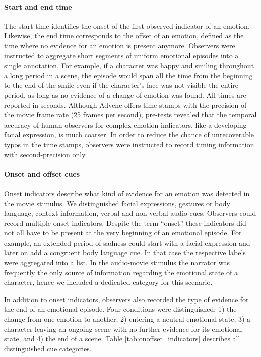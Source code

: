 \paragraph{Start and end time}

The start time identifies the onset of the first observed indicator of an
emotion. Likewise, the end time corresponds to the offset of an emotion,
defined as the time where no evidence for an emotion is present anymore.
Observers were instructed to aggregate short segments of uniform emotional
episodes into a single annotation. For example, if a character was happy and
smiling throughout a long period in a scene, the episode would span all the
time from the beginning to the end of the smile even if the character's face was
not visible the entire period, as long as no evidence of a change of emotion
was found.  All times are reported in seconds. Although Advene offers time
stamps with the precision of the movie frame rate (25 frames per second),
pre-tests revealed that the temporal accuracy of human observers for complex
emotion indicators, like a developing facial expression, is much coarser. In
order to reduce the chance of unrecoverable typos in the time stamps, observers
were instructed to record timing information with second-precision only.

\paragraph{Onset and offset cues}

Onset indicators describe what kind of evidence for an emotion was detected in
the movie stimulus. We distinguished facial expressions, gestures or body
language, context information, verbal and non-verbal audio cues. Observers
could record multiple onset indicators. Despite the term ``onset'' these
indicators did not all have to be present at the very beginning of an emotional
episode. For example, an extended period of sadness could start with a facial
expression and later on add a congruent body language cue. In that case the
respective labels were aggregated into a list. In the audio-movie stimulus the
narrator was frequently the only source of information regarding the emotional
state of a character, hence we included a dedicated category for this scenario.

In addition to onset indicators, observers also recorded the type of evidence
for the end of an emotional episode. Four conditions were distinguished: 1) the
change from one emotion to another, 2) entering a neutral emotional state, 3) a
character leaving an ongoing scene with no further evidence for its emotional
state, and 4) the end of a scene.  Table \ref{tab:onoffset_indicators}
describes all distinguished cue categories.


